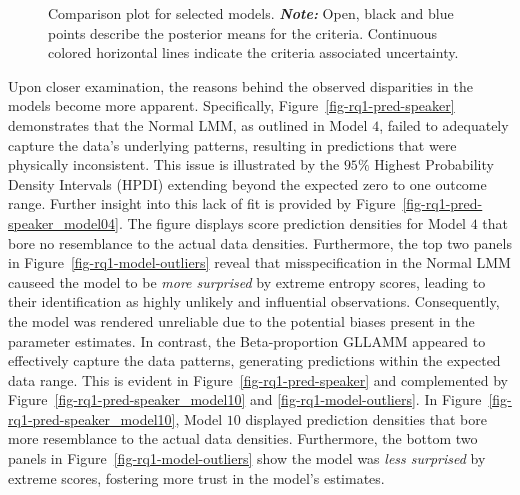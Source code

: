 \documentclass[
  authoryear,
  preprint,
  1p]{elsarticle}
\begin{document}
\label{cell-fig-rq1-waic-psis}
\begin{figure}[H]


\caption{\label{fig-rq1-waic-psis}Comparison plot for selected models.
\textbf{\emph{Note:}} Open, black and blue points describe the posterior
means for the criteria. Continuous colored horizontal lines indicate the
criteria associated uncertainty.}

\end{figure}%

Upon closer examination, the reasons behind the observed disparities in
the models become more apparent. Specifically,
Figure~\ref{fig-rq1-pred-speaker} demonstrates that the Normal LMM, as
outlined in Model \(4\), failed to adequately capture the data's
underlying patterns, resulting in predictions that were physically
inconsistent. This issue is illustrated by the \(95\%\) Highest
Probability Density Intervals (HPDI) extending beyond the expected zero
to one outcome range. Further insight into this lack of fit is provided
by Figure~\ref{fig-rq1-pred-speaker_model04}. The figure displays score
prediction densities for Model \(4\) that bore no resemblance to the
actual data densities. Furthermore, the top two panels in
Figure~\ref{fig-rq1-model-outliers} reveal that misspecification in the
Normal LMM causeed the model to be \emph{more surprised} by extreme
entropy scores, leading to their identification as highly unlikely and
influential observations. Consequently, the model was rendered
unreliable due to the potential biases present in the parameter
estimates. In contrast, the Beta-proportion GLLAMM appeared to
effectively capture the data patterns, generating predictions within the
expected data range. This is evident in
Figure~\ref{fig-rq1-pred-speaker} and complemented by
Figure~\ref{fig-rq1-pred-speaker_model10} and
\ref{fig-rq1-model-outliers}. In
Figure~\ref{fig-rq1-pred-speaker_model10}, Model \(10\) displayed
prediction densities that bore more resemblance to the actual data
densities. Furthermore, the bottom two panels in
Figure~\ref{fig-rq1-model-outliers} show the model was \emph{less
surprised} by extreme scores, fostering more trust in the model's
estimates.
\end{document}
